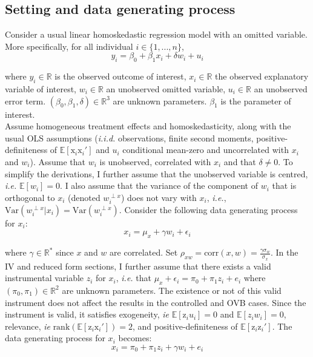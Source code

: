 \documentclass[usletter, 12pt]{article}
\begin{document}
		\subsection{Setting and data generating process}\label{maths_dgp}
		
			Consider a usual linear homoskedastic regression model with an omitted variable. More specifically, for all individual $i \in \{1, ..., n\}$, 
				~
				\begin{equation}\label{maths_dgp_y}
					y_i = \beta_{0} + \beta_{1}x_{i} + \delta w_{i} + u_i
				\end{equation}
				
				where $y_i \in \mathbb{R}$ is the observed outcome of interest, $x_i \in \mathbb{R}$ the observed explanatory variable of interest,  $w_i \in \mathbb{R}$ an unobserved omitted variable, $u_i \in \mathbb{R}$ an unobserved error term.  $(\beta_0, \beta_1, \delta) \in \mathbb{R}^{3}$ are unknown parameters. $\beta_1$ is the parameter of interest.\\
			
			Assume homogeneous treatment effects and homoskedasticity, along with the usual OLS assumptions (\textit{i.i.d.} observations, finite second moments, positive-definiteness of $\mathbb{E}[\text{x}_i \text{x}_i']$ and $u_{i}$ conditional mean-zero and uncorrelated with $x_i$ and $w_i$). Assume that $w_{i}$ is unobserved, correlated with $x_{i}$ and that $\delta \neq 0$. To simplify the derivations, I further assume that the unobserved variable is centred, \textit{i.e.} $\mathbb{E}[w_i] = 0$. I also assume that the variance of the component of $w_{i}$ that is orthogonal to $x_{i}$ (denoted $w_{i}^{\perp x}$) does not vary with $x_{i}$, \textit{i.e.}, $\text{Var}(w_{i}^{\perp x}|x_{i}) = \text{Var}(w_{i}^{\perp x})$. Consider the following data generating process for $x_i$:
				~
				\begin{equation}\label{maths_dgp_x}
					x_i = \mu_{x} + \gamma w_{i} + \epsilon_i
				\end{equation}
				
				where $\gamma \in \mathbb{R}^{*}$ since $x$ and $w$ are correlated. Set $\rho_{xw} = \text{corr}(x, w) =  \frac{\gamma \sigma_{w}}{\sigma_{x}}$. In the IV and reduced form sections, I further assume that there exists a valid instrumental variable $z_i$ for $x_i$, \textit{i.e.} that $\mu_x + \epsilon_{i} = \pi_0 + \pi_1 z_i + e_{i}$  where $(\pi_0, \pi_1) \in \mathbb{R}^{2}$ are unknown parameters. The existence or not of this valid instrument does not affect the results in the controlled and \textsc{OVB} cases. Since the instrument is valid, it satisfies exogeneity, \textit{ie} $\mathbb{E}[\text{z}_{i}u_{i}] = 0$ and  $\mathbb{E}[z_{i}w_{i}] = 0$, relevance, \textit{ie} $\text{rank}(\mathbb{E}[\text{z}_{i}\text{x}_i']) = 2$,  and positive-definiteness of $\mathbb{E}[\text{z}_i \text{z}_i']$. The data generating process for $x_i$ becomes:			
				~
				\begin{equation}\label{maths_dgp_x_iv}
					x_i = \pi_0 + \pi_1 z_i + \gamma w_{i} + e_{i}
				\end{equation}
				
\end{document}
